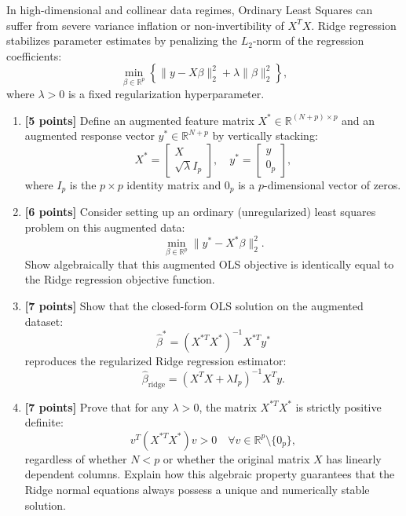 \documentclass[11pt,a4paper]{article}
\begin{document}
In high-dimensional and collinear data regimes, Ordinary Least Squares can suffer from severe variance inflation or non-invertibility of $X^T X$. Ridge regression stabilizes parameter estimates by penalizing the $L_2$-norm of the regression coefficients:
\[
  \min_{\beta \in \mathbb{R}^p} \left\{ \|y - X\beta\|_2^2 + \lambda \|\beta\|_2^2 \right\},
\]
where $\lambda > 0$ is a fixed regularization hyperparameter.

\begin{enumerate}[label=(\alph*), itemsep=5pt, leftmargin=18pt]
  \item \textbf{[5 points]} Define an augmented feature matrix $X^* \in \mathbb{R}^{(N+p) \times p}$ and an augmented response vector $y^* \in \mathbb{R}^{N+p}$ by vertically stacking:
  \[
    X^* = \begin{bmatrix} X \\ \sqrt{\lambda} I_p \end{bmatrix}, \quad y^* = \begin{bmatrix} y \\ 0_p \end{bmatrix},
  \]
  where $I_p$ is the $p \times p$ identity matrix and $0_p$ is a $p$-dimensional vector of zeros.

  \item \textbf{[6 points]} Consider setting up an ordinary (unregularized) least squares problem on this augmented data:
  \[
    \min_{\beta \in \mathbb{R}^p} \|y^* - X^* \beta\|_2^2.
  \]
  Show algebraically that this augmented OLS objective is identically equal to the Ridge regression objective function.

  \item \textbf{[7 points]} Show that the closed-form OLS solution on the augmented dataset:
  \[
    \hat{\beta}^* = (X^{*T} X^*)^{-1} X^{*T} y^*
  \]
  reproduces the regularized Ridge regression estimator:
  \[
    \hat{\beta}_{\text{ridge}} = (X^T X + \lambda I_p)^{-1} X^T y.
  \]

  \item \textbf{[7 points]} Prove that for any $\lambda > 0$, the matrix $X^{*T} X^*$ is strictly positive definite:
  \[
    v^T (X^{*T} X^*) v > 0 \quad \forall v \in \mathbb{R}^p \setminus \{0_p\},
  \]
  regardless of whether $N < p$ or whether the original matrix $X$ has linearly dependent columns. Explain how this algebraic property guarantees that the Ridge normal equations always possess a unique and numerically stable solution.
\end{enumerate}
\end{document}
